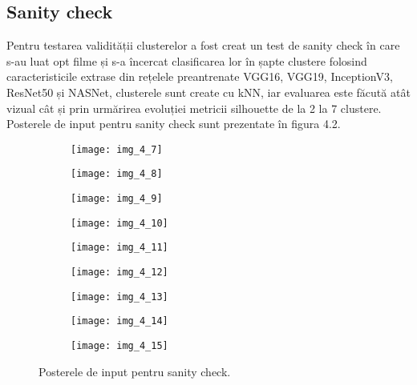 \subsection{Sanity check}
Pentru testarea validității clusterelor a fost creat un test de sanity check în care s-au luat opt filme și s-a încercat clasificarea lor în șapte clustere folosind caracteristicile extrase din rețelele preantrenate VGG16, VGG19, InceptionV3, ResNet50 și NASNet, clusterele sunt create cu kNN, iar evaluarea este făcută atât vizual cât și prin urmărirea evoluției metricii silhouette de la 2 la 7 clustere. Posterele de input pentru sanity check sunt prezentate în figura 4.2.
\begin{figure}[!h]
  \centering
  \begin{subfigure}[b]{0.48\textwidth}
    \texttt{[image: img\_4\_7]}
  \end{subfigure}
  \hfill
  \begin{subfigure}[b]{0.48\textwidth}
    \texttt{[image: img\_4\_8]}
  \end{subfigure}
    \hfill
  \begin{subfigure}[b]{0.48\textwidth}
    \texttt{[image: img\_4\_9]}
  \end{subfigure}
  \hfill
  \begin{subfigure}[b]{0.48\textwidth}
    \texttt{[image: img\_4\_10]}
  \end{subfigure}
  \hfill
  \begin{subfigure}[b]{0.48\textwidth}
    \texttt{[image: img\_4\_11]}
  \end{subfigure}
  \hfill
  \begin{subfigure}[b]{0.48\textwidth}
    \texttt{[image: img\_4\_12]}
  \end{subfigure}
    \hfill
  \begin{subfigure}[b]{0.48\textwidth}
    \texttt{[image: img\_4\_13]}
  \end{subfigure}
    \hfill
  \begin{subfigure}[b]{0.48\textwidth}
    \texttt{[image: img\_4\_14]}
  \end{subfigure}
      \hfill
  \begin{subfigure}[b]{0.3\textwidth}
    \texttt{[image: img\_4\_15]}
  \end{subfigure}
  \caption[Postere input sanity check]{Posterele de input pentru sanity check.}
\end{figure}

